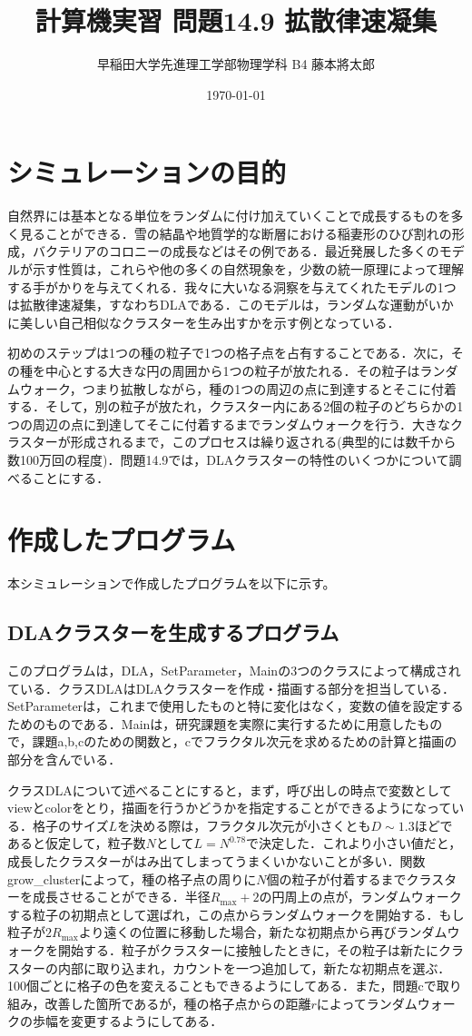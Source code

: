 \documentclass{jsarticle}
\title{計算機実習 問題14.9 拡散律速凝集}
\author{早稲田大学先進理工学部物理学科 B4 藤本將太郎}
\date{\today}
\begin{document}
\maketitle
    
\section{シミュレーションの目的}
    自然界には基本となる単位をランダムに付け加えていくことで成長するものを多く見ることができる．雪の結晶や地質学的な断層における稲妻形のひび割れの形成，バクテリアのコロニーの成長などはその例である．最近発展した多くのモデルが示す性質は，これらや他の多くの自然現象を，少数の統一原理によって理解する手がかりを与えてくれる．我々に大いなる洞察を与えてくれたモデルの1つは拡散律速凝集，すなわちDLAである．このモデルは，ランダムな運動がいかに美しい自己相似なクラスターを生み出すかを示す例となっている．

    初めのステップは1つの種の粒子で1つの格子点を占有することである．次に，その種を中心とする大きな円の周囲から1つの粒子が放たれる．その粒子はランダムウォーク，つまり拡散しながら，種の1つの周辺の点に到達するとそこに付着する．そして，別の粒子が放たれ，クラスター内にある2個の粒子のどちらかの1つの周辺の点に到達してそこに付着するまでランダムウォークを行う．大きなクラスターが形成されるまで，このプロセスは繰り返される(典型的には数千から数100万回の程度)．問題14.9では，DLAクラスターの特性のいくつかについて調べることにする．
\section{作成したプログラム}
    本シミュレーションで作成したプログラムを以下に示す。
    \subsection{DLAクラスターを生成するプログラム}
    このプログラムは，DLA，SetParameter，Mainの3つのクラスによって構成されている．クラスDLAはDLAクラスターを作成・描画する部分を担当している．SetParameterは，これまで使用したものと特に変化はなく，変数の値を設定するためのものである．Mainは，研究課題を実際に実行するために用意したもので，課題a,b,cのための関数と，cでフラクタル次元を求めるための計算と描画の部分を含んでいる．
    
    クラスDLAについて述べることにすると，まず，呼び出しの時点で変数としてviewとcolorをとり，描画を行うかどうかを指定することができるようになっている．格子のサイズ$L$を決める際は，フラクタル次元が小さくとも$D\sim1.3$ほどであると仮定して，粒子数$N$として$L=N^{0.78}$で決定した．これより小さい値だと，成長したクラスターがはみ出てしまってうまくいかないことが多い．関数grow\_clusterによって，種の格子点の周りに$N$個の粒子が付着するまでクラスターを成長させることができる．半径$R_{\mathrm{max}}+2$の円周上の点が，ランダムウォークする粒子の初期点として選ばれ，この点からランダムウォークを開始する．もし粒子が$2R_{\mathrm{max}}$より遠くの位置に移動した場合，新たな初期点から再びランダムウォークを開始する．粒子がクラスターに接触したときに，その粒子は新たにクラスターの内部に取り込まれ，カウントを一つ追加して，新たな初期点を選ぶ．100個ごとに格子の色を変えることもできるようにしてある．また，問題cで取り組み，改善した箇所であるが，種の格子点からの距離$r$によってランダムウォークの歩幅を変更するようにしてある．
    
\end{document}
